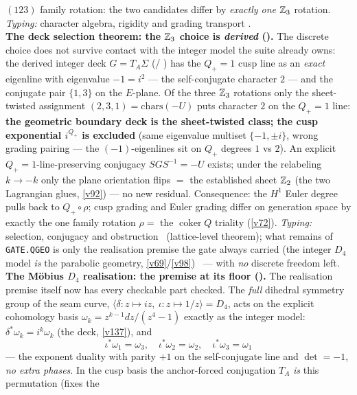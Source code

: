 \begin{keybox}
$(123)$ family rotation: the two candidates differ by \emph{exactly one} $\mathbb{Z}_3$ rotation. \emph{Typing:}
character algebra, rigidity and grading transport \mE.
\smallskip\\
\noindent\textbf{The deck selection theorem: the $\mathbb{Z}_3$ choice is \emph{derived}
().} The discrete choice does not survive contact with the integer model
the suite already owns: the derived integer deck $G=T_A\Sigma$ (/%
) has the $Q_+{=}1$ cusp line as an \emph{exact} eigenline with
eigenvalue $-1=i^2$ --- the self-conjugate character $2$ --- and the conjugate pair $\{1,3\}$ on the
$E$-plane. Of the three $\mathbb{Z}_3$ rotations only the sheet-twisted assignment $(2,3,1)=\mathrm{chars}(-U)$
puts character $2$ on the $Q_+{=}1$ line: \textbf{the geometric boundary deck is the sheet-twisted class;
the cusp exponential $i^{Q_+}$ is excluded} (same eigenvalue multiset $\{-1,\pm i\}$, wrong grading
pairing --- the $(-1)$-eigenlines sit on $Q_+$ degrees $1$ vs $2$). An explicit $Q_+{=}1$-line-preserving
conjugacy $SGS^{-1}=-U$ exists; under the relabeling $k\to-k$ only the plane orientation flips $=$ the
established sheet $\mathbb{Z}_2$ (the two Lagrangian glues, \vref{v92}) --- no new residual. Consequence: the
$H^1$ Euler degree pulls back to $Q_+\!\circ\rho$; cusp grading and Euler grading differ on generation
space by exactly the one family rotation $\rho=$ the $\operatorname{coker}Q$ triality (\vref{v72}).
\emph{Typing:} selection, conjugacy and obstruction \mE\ (lattice-level theorem); what remains of
\texttt{GATE.QGEO} is only the realisation premise the gate always carried (the integer $D_4$ model
\emph{is} the parabolic geometry, \vref{v69}/\vref{v98}) \mC\ --- with \emph{no} discrete freedom left.
\smallskip\\
\noindent\textbf{The M\"obius $D_4$ realisation: the premise at its floor
().} The realisation premise itself now has every checkable part checked.
The \emph{full} dihedral symmetry group of the seam curve, $\langle\delta\!:z\mapsto iz,\ \iota\!:z\mapsto
1/z\rangle=D_4$, acts on the explicit cohomology basis $\omega_k=z^{k-1}dz/(z^4{-}1)$ exactly as the
integer model: $\delta^*\omega_k=i^k\omega_k$ (the deck, \vref{v137}), and
\[
  \boxed{\ \iota^*\omega_1=\omega_3,\quad \iota^*\omega_2=\omega_2,\quad \iota^*\omega_3=\omega_1\ }
\]
--- the exponent duality with parity $+1$ on the self-conjugate line and $\det=-1$, \emph{no extra
phases}. In the cusp basis the anchor-forced conjugation $T_A$ \emph{is} this permutation (fixes the

\end{keybox}
